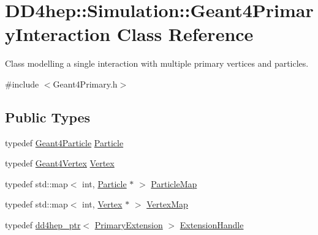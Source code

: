 \hypertarget{class_d_d4hep_1_1_simulation_1_1_geant4_primary_interaction}{}\section{D\+D4hep\+:\+:Simulation\+:\+:Geant4\+Primary\+Interaction Class Reference}
\label{class_d_d4hep_1_1_simulation_1_1_geant4_primary_interaction}


Class modelling a single interaction with multiple primary vertices and particles.  




{\ttfamily \#include $<$Geant4\+Primary.\+h$>$}

\subsection*{Public Types}
\begin{DoxyCompactItemize}
\item 
typedef \hyperlink{class_d_d4hep_1_1_simulation_1_1_geant4_particle}{Geant4\+Particle} \hyperlink{class_d_d4hep_1_1_simulation_1_1_geant4_primary_interaction_a5b651f0c428d71ffdac8cb38bc6f3513}{Particle}
\item 
typedef \hyperlink{class_d_d4hep_1_1_simulation_1_1_geant4_vertex}{Geant4\+Vertex} \hyperlink{class_d_d4hep_1_1_simulation_1_1_geant4_primary_interaction_a2577cfaf475b28c703eb8e0dce5cccde}{Vertex}
\item 
typedef std\+::map$<$ int, \hyperlink{class_d_d4hep_1_1_simulation_1_1_geant4_primary_interaction_a5b651f0c428d71ffdac8cb38bc6f3513}{Particle} $\ast$ $>$ \hyperlink{class_d_d4hep_1_1_simulation_1_1_geant4_primary_interaction_a6787a2c42dc1fd371b274e75dc380e92}{Particle\+Map}
\item 
typedef std\+::map$<$ int, \hyperlink{class_d_d4hep_1_1_simulation_1_1_geant4_primary_interaction_a2577cfaf475b28c703eb8e0dce5cccde}{Vertex} $\ast$ $>$ \hyperlink{class_d_d4hep_1_1_simulation_1_1_geant4_primary_interaction_a0016a8298291af16ea8f24a054cb864c}{Vertex\+Map}
\item 
typedef \hyperlink{class_d_d4hep_1_1dd4hep__ptr}{dd4hep\+\_\+ptr}$<$ \hyperlink{class_d_d4hep_1_1_simulation_1_1_primary_extension}{Primary\+Extension} $>$ \hyperlink{class_d_d4hep_1_1_simulation_1_1_geant4_primary_interaction_a9d53c6c8fa2e7a6094ba91854af945f4}{Extension\+Handle}
\end{DoxyCompactItemize}
